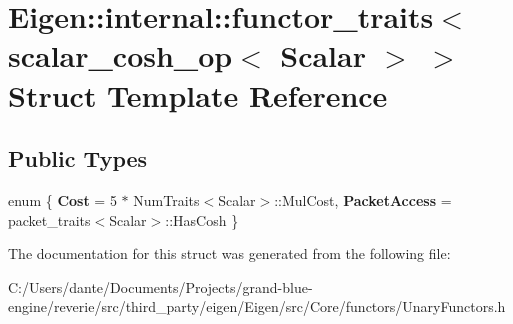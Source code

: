 \hypertarget{struct_eigen_1_1internal_1_1functor__traits_3_01scalar__cosh__op_3_01_scalar_01_4_01_4}{}\section{Eigen\+::internal\+::functor\+\_\+traits$<$ scalar\+\_\+cosh\+\_\+op$<$ Scalar $>$ $>$ Struct Template Reference}
\label{struct_eigen_1_1internal_1_1functor__traits_3_01scalar__cosh__op_3_01_scalar_01_4_01_4}
\subsection*{Public Types}
\begin{DoxyCompactItemize}
\item 
\mbox{\label{struct_eigen_1_1internal_1_1functor__traits_3_01scalar__cosh__op_3_01_scalar_01_4_01_4_ad945bc6de8b5cbc96b9ebcdfb75fce14}} 
enum \{ {\bfseries Cost} = 5 $\ast$ Num\+Traits$<$Scalar$>$\+::Mul\+Cost, 
{\bfseries Packet\+Access} = packet\+\_\+traits$<$Scalar$>$\+::Has\+Cosh
 \}
\end{DoxyCompactItemize}


The documentation for this struct was generated from the following file\+:\begin{DoxyCompactItemize}
\item 
C\+:/\+Users/dante/\+Documents/\+Projects/grand-\/blue-\/engine/reverie/src/third\+\_\+party/eigen/\+Eigen/src/\+Core/functors/Unary\+Functors.\+h\end{DoxyCompactItemize}
